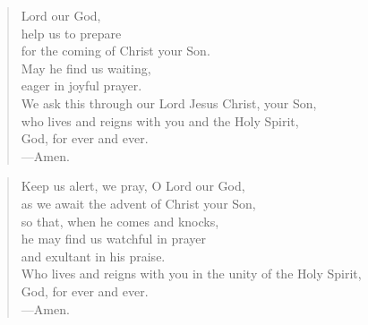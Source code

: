 \prayer

\setlength{\vleftmargin}{\prayerleftmargini}

\begin{verse}
Lord our God,\\
help us to prepare\\
for the coming of Christ your Son.\\
May he find us waiting,\\
eager in joyful prayer.\\
We ask this through our Lord Jesus Christ, your Son,\\
who lives and reigns with you and the Holy Spirit,\\
God, for ever and ever.\\
{\color{red}---\thinspace}Amen.
\end{verse}


\begin{verse}
Keep us alert, we pray, O Lord our God,\\
as we await the advent of Christ your Son,\\
so that, when he comes and knocks,\\
he may find us watchful in prayer\\
and exultant in his praise.\\
Who lives and reigns with you in the unity of the Holy Spirit,\\
God, for ever and ever.\\
{\color{red}---\thinspace}Amen.
\end{verse}

\setlength{\vleftmargin}{\defleftmargini}